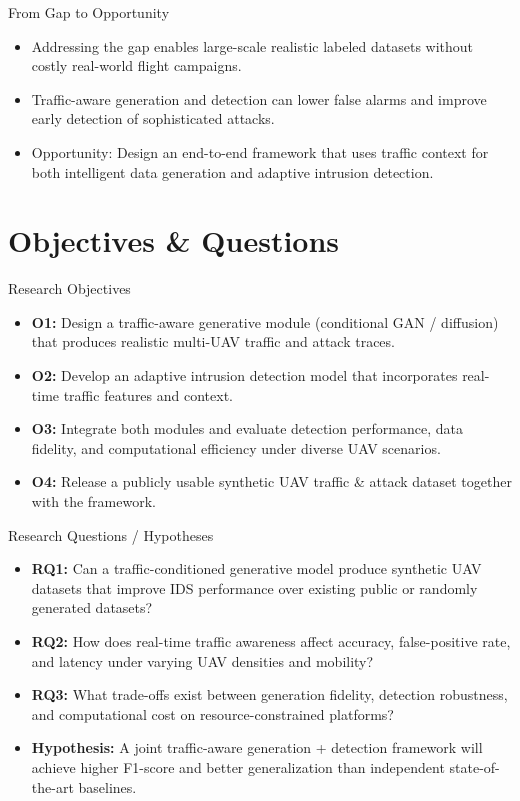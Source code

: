 \documentclass[10pt]{beamer}
\begin{document}
\begin{frame}{From Gap to Opportunity}
    \begin{itemize}
        \item Addressing the gap enables large-scale realistic labeled datasets without costly real-world flight campaigns.
        \item Traffic-aware generation and detection can lower false alarms and improve early detection of sophisticated attacks.
        \item Opportunity: Design an end-to-end framework that uses traffic context for both intelligent data generation and adaptive intrusion detection.
    \end{itemize}
\end{frame}

\section{Objectives \& Questions}
\begin{frame}{Research Objectives}
    \begin{itemize}
        \item \textbf{O1:} Design a traffic-aware generative module (conditional GAN / diffusion) that produces realistic multi-UAV traffic and attack traces.
        \item \textbf{O2:} Develop an adaptive intrusion detection model that incorporates real-time traffic features and context.
        \item \textbf{O3:} Integrate both modules and evaluate detection performance, data fidelity, and computational efficiency under diverse UAV scenarios.
        \item \textbf{O4:} Release a publicly usable synthetic UAV traffic \& attack dataset together with the framework.
    \end{itemize}
\end{frame}

\begin{frame}{Research Questions / Hypotheses}
    \begin{itemize}
        \item \textbf{RQ1:} Can a traffic-conditioned generative model produce synthetic UAV datasets that improve IDS performance over existing public or randomly generated datasets?
        \item \textbf{RQ2:} How does real-time traffic awareness affect accuracy, false-positive rate, and latency under varying UAV densities and mobility?
        \item \textbf{RQ3:} What trade-offs exist between generation fidelity, detection robustness, and computational cost on resource-constrained platforms?
        \item \textbf{Hypothesis:} A joint traffic-aware generation + detection framework will achieve higher F1-score and better generalization than independent state-of-the-art baselines.
    \end{itemize}
\end{frame}
\end{document}
